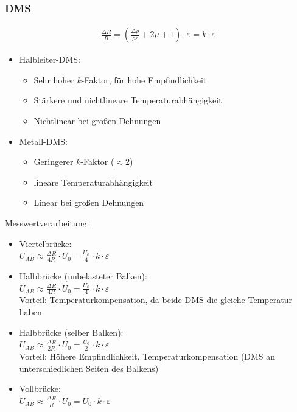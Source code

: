     \subsubsection{DMS}
        \begin{align*}
            \frac{\Delta R}{R} = \left( \frac{\Delta \rho}{\rho \varepsilon} + 2 \mu + 1 \right) \cdot \varepsilon = k \cdot \varepsilon
        \end{align*}
        \begin{itemize}
            \item Halbleiter-DMS:
                \begin{itemize}
                    \item Sehr hoher \(k\)-Faktor, für hohe Empfindlichkeit
                    \item Stärkere und nichtlineare Temperaturabhängigkeit
                    \item Nichtlinear bei großen Dehnungen
                \end{itemize}
            \item Metall-DMS:
                \begin{itemize}
                    \item Geringerer \(k\)-Faktor (\(\approx 2\))
                    \item lineare Temperaturabhängigkeit
                    \item Linear bei großen Dehnungen
                \end{itemize}
        \end{itemize}
        Messwertverarbeitung:
        \begin{itemize}
            \item Viertelbrücke: \\
                \(U_{AB} \approx \frac{\Delta R}{4R} \cdot U_0 = \frac{U_0}{4} \cdot k \cdot \varepsilon\)
            \item Halbbrücke (unbelasteter Balken): \\
                \(U_{AB} \approx \frac{\Delta R}{4R} \cdot U_0 = \frac{U_0}{4} \cdot k \cdot \varepsilon\) \\
                Vorteil: Temperaturkompensation, da beide DMS die gleiche Temperatur haben
            \item Halbbrücke (selber Balken): \\
                \(U_{AB} \approx \frac{\Delta R}{2R} \cdot U_0 = \frac{U_0}{2} \cdot k \cdot \varepsilon\) \\
                Vorteil: Höhere Empfindlichkeit, Temperaturkompensation (DMS an unterschiedlichen Seiten des Balkens)
            \item Vollbrücke: \\
                \(U_{AB} \approx \frac{\Delta R}{R} \cdot U_0 = U_0 \cdot k \cdot \varepsilon\)
        \end{itemize}

